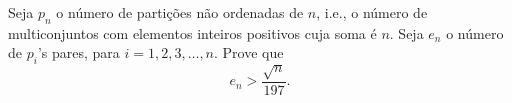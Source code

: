 Seja $p_n$ o número de partições não ordenadas de $n$, i.e., o número de multiconjuntos com elementos inteiros positivos cuja soma é $n$.
Seja $e_n$ o número de $p_i$'s pares, para $i = 1, 2, 3, \dots, n$.
Prove que \[e_n > \frac{\sqrt{n}}{197}.\]
